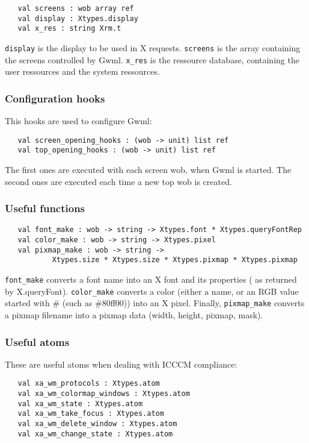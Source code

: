 \documentclass{book}
\begin{document}
\begin{verbatim}
   val screens : wob array ref
   val display : Xtypes.display
   val x_res : string Xrm.t
\end{verbatim}

  {\tt display} is the display to be used in X requests. {\tt screens} is 
the array containing the screens controlled by Gwml. {\tt x\_res} is the 
ressource database, containing the user ressources and the system ressources.

\subsubsection{Configuration hooks}

  This hooks are used to configure Gwml:
\begin{verbatim}
   val screen_opening_hooks : (wob -> unit) list ref
   val top_opening_hooks : (wob -> unit) list ref 
\end{verbatim}

  The first ones are executed with each screen wob, when Gwml is started.
The second ones are executed each time a new top wob is created.

\subsubsection{Useful functions}

\begin{verbatim}
   val font_make : wob -> string -> Xtypes.font * Xtypes.queryFontRep
   val color_make : wob -> string -> Xtypes.pixel
   val pixmap_make : wob -> string ->
           Xtypes.size * Xtypes.size * Xtypes.pixmap * Xtypes.pixmap
\end{verbatim}

  {\tt font\_make} converts a font name into an X font and its properties (
as returned by X.queryFont). {\tt color\_make} converts a color (either a 
name, or an RGB value started with \# (such as \#80ff00)) into an X pixel.
Finally, {\tt pixmap\_make} converts a pixmap filename into a pixmap data
(width, height, pixmap, mask).

\subsubsection{Useful atoms}

These are useful atoms when dealing with ICCCM compliance:
\begin{verbatim}
   val xa_wm_protocols : Xtypes.atom
   val xa_wm_colormap_windows : Xtypes.atom
   val xa_wm_state : Xtypes.atom
   val xa_wm_take_focus : Xtypes.atom
   val xa_wm_delete_window : Xtypes.atom
   val xa_wm_change_state : Xtypes.atom
\end{verbatim}
\end{document}
